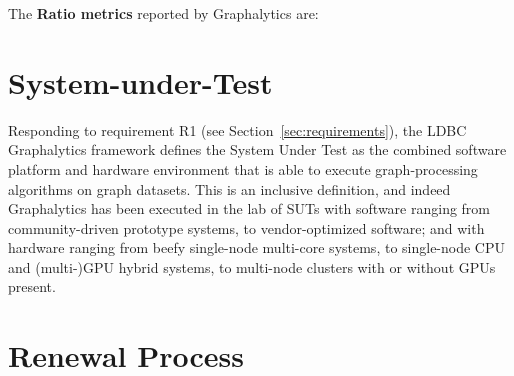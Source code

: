 The {\bf Ratio metrics} reported by Graphalytics are:

\begin{itemize}
\end{itemize}











\section{System-under-Test} \label{sec:sut}

Responding to requirement R1 (see Section~\ref{sec:requirements}), the LDBC Graphalytics framework defines the System Under Test as the combined software platform and hardware environment that is able to execute graph-processing algorithms on graph datasets. This is an inclusive definition, and indeed Graphalytics has been executed in the lab of SUTs with software ranging from community-driven prototype systems, to vendor-optimized software; and with hardware ranging from beefy single-node multi-core systems, to single-node CPU and (multi-)GPU hybrid systems, to multi-node clusters with or without GPUs present. 


\section{Renewal Process} \label{sec:renewal}

